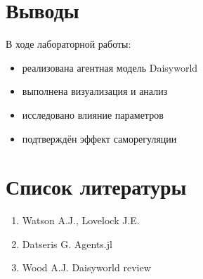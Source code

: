 \documentclass[
  english,
  russian,
  12pt,
  a4paper,
  DIV=11,
  numbers=noendperiod]{scrreprt}
\providecommand{\tightlist}{%
  \setlength{\itemsep}{0pt}\setlength{\parskip}{0pt}}
\begin{document}
\chapter{Выводы}\label{ux432ux44bux432ux43eux434ux44b}

В ходе лабораторной работы:

\begin{itemize}
\tightlist
\item
  реализована агентная модель Daisyworld
\item
  выполнена визуализация и анализ
\item
  исследовано влияние параметров
\item
  подтверждён эффект саморегуляции
\end{itemize}

\chapter{Список
литературы}\label{ux441ux43fux438ux441ux43eux43a-ux43bux438ux442ux435ux440ux430ux442ux443ux440ux44b}

\begin{enumerate}
\def\labelenumi{\arabic{enumi}.}
\tightlist
\item
  Watson A.J., Lovelock J.E.
\item
  Datseris G. Agents.jl
\item
  Wood A.J. Daisyworld review
\end{enumerate}


\printbibliography
\end{document}
